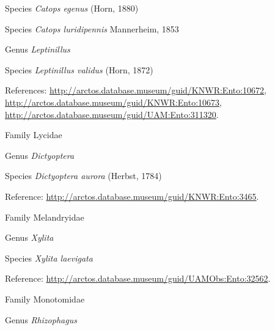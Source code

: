 \documentclass[9pt, article]{memoir}
\begin{document}
\begin{multicols}{2}
\vspace{6pt}\noindent\hspace{36pt}Species \textit{Catops egenus} (Horn, 1880)


\vspace{6pt}\noindent\hspace{36pt}Species \textit{Catops luridipennis} Mannerheim, 1853


\vspace{6pt}\noindent\hspace{30pt}Genus \textit{Leptinillus}


\vspace{6pt}\noindent\hspace{36pt}Species \textit{Leptinillus validus} (Horn, 1872)


References: 
\url{http://arctos.database.museum/guid/KNWR:Ento:10672}, 
\url{http://arctos.database.museum/guid/KNWR:Ento:10673}, 
\url{http://arctos.database.museum/guid/UAM:Ento:311320}.

\vspace{6pt}\noindent\hspace{24pt}Family Lycidae


\vspace{6pt}\noindent\hspace{30pt}Genus \textit{Dictyoptera}


\vspace{6pt}\noindent\hspace{36pt}Species \textit{Dictyoptera aurora} (Herbst, 1784)


Reference: 
\url{http://arctos.database.museum/guid/KNWR:Ento:3465}.

\vspace{6pt}\noindent\hspace{24pt}Family Melandryidae


\vspace{6pt}\noindent\hspace{30pt}Genus \textit{Xylita}


\vspace{6pt}\noindent\hspace{36pt}Species \textit{Xylita laevigata}


Reference: 
\url{http://arctos.database.museum/guid/UAMObs:Ento:32562}.

\vspace{6pt}\noindent\hspace{24pt}Family Monotomidae


\vspace{6pt}\noindent\hspace{30pt}Genus \textit{Rhizophagus}



\end{multicols}
\end{document}
